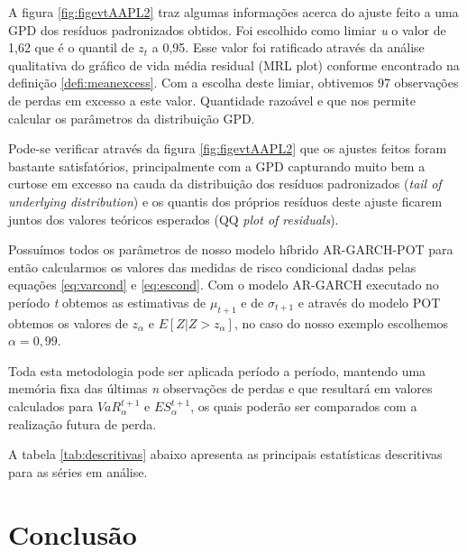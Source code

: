 \documentclass[review]{elsarticle}
\theoremstyle{definition}
\begin{document}
A figura \ref{fig:figevtAAPL2} traz algumas informações acerca do ajuste feito a uma GPD dos resíduos padronizados obtidos. Foi escolhido como limiar \emph{u} o valor de 1,62 que é o quantil de $z_t$ a 0,95. Esse valor foi ratificado através da análise qualitativa do gráfico de vida média residual (MRL plot) conforme encontrado na definição \ref{defi:meanexcess}. Com a escolha deste limiar, obtivemos 97 observações de perdas em excesso a este valor. Quantidade razoável e que nos permite calcular os parâmetros da distribuição GPD.

Pode-se verificar através da figura \ref{fig:figevtAAPL2} que os ajustes feitos foram bastante satisfatórios, principalmente com a GPD capturando muito bem a curtose em excesso na cauda da distribuição dos resíduos padronizados (\emph{tail of underlying distribution}) e os quantis dos próprios resíduos deste ajuste ficarem juntos dos valores teóricos esperados (QQ \emph{plot of residuals}).

Possuímos todos os parâmetros de nosso modelo híbrido AR-GARCH-POT para então calcularmos os valores das medidas de risco condicional dadas pelas equações \eqref{eq:varcond} e \eqref{eq:escond}. Com o modelo AR-GARCH executado no período \emph{t} obtemos as estimativas de $\mu_{t+1}$ e de $\sigma_{t+1}$ e através do modelo POT obtemos os valores de $z_\alpha$ e $E[Z|Z>z_\alpha]$, no caso do nosso exemplo escolhemos $\alpha=0,99$.

Toda esta metodologia pode ser aplicada período a período, mantendo uma memória fixa das últimas \emph{n} observações de perdas e que resultará em valores calculados para $VaR_\alpha^{t+1}$ e $ES_\alpha^{t+1}$, os quais poderão ser comparados com a realização futura de perda.

A tabela \ref{tab:descritivas} abaixo apresenta as principais estatísticas descritivas para as séries em análise.



\section{Conclusão}
\end{document}
